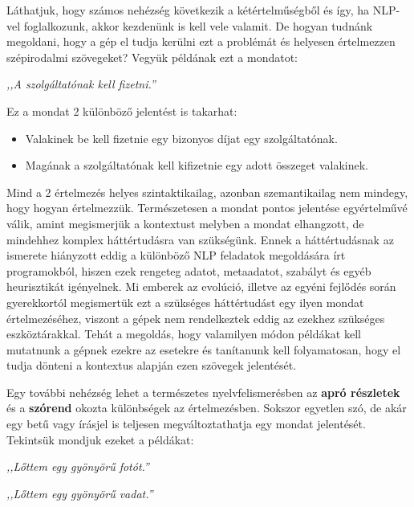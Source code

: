 Láthatjuk, hogy számos nehézség következik a kétértelműségből és így, ha NLP-vel foglalkozunk, akkor kezdenünk is kell vele valamit. De hogyan tudnánk megoldani, hogy a gép el tudja kerülni ezt a problémát és helyesen értelmezzen szépirodalmi szövegeket? 
Vegyük példának ezt a mondatot:

\vspace{0.5cm}
\centerline{\textit{,,A szolgáltatónak kell fizetni.''}}
\vspace{0.5cm}

\noindent Ez a mondat 2 különböző jelentést is takarhat:

\begin{itemize}
\item Valakinek be kell fizetnie egy bizonyos díjat egy szolgáltatónak.
\item Magának a szolgáltatónak kell kifizetnie egy adott összeget valakinek.
\end{itemize}

Mind a 2 értelmezés helyes szintaktikailag, azonban szemantikailag nem mindegy, hogy hogyan értelmezzük. Természetesen a mondat pontos jelentése egyértelművé válik, amint megismerjük a kontextust  melyben a mondat elhangzott, de mindehhez komplex háttértudásra van szükségünk. Ennek a háttértudásnak az ismerete hiányzott eddig a különböző NLP feladatok megoldására írt programokból, hiszen ezek rengeteg adatot, metaadatot, szabályt és egyéb heurisztikát igényelnek. Mi emberek az evolúció, illetve az egyéni fejlődés során gyerekkortól megismertük ezt a szükséges háttértudást egy ilyen mondat értelmezéséhez, viszont a gépek nem rendelkeztek eddig az ezekhez szükséges eszköztárakkal. Tehát a megoldás, hogy valamilyen módon példákat kell mutatnunk a gépnek ezekre az esetekre és tanítanunk kell folyamatosan, hogy el tudja dönteni a kontextus alapján ezen szövegek jelentését.

Egy további nehézség lehet a természetes nyelvfelismerésben az \textbf{apró részletek} és a \textbf{szórend} okozta különbségek az értelmezésben. Sokszor egyetlen szó, de akár egy betű vagy írásjel is teljesen megváltoztathatja egy mondat jelentését. Tekintsük mondjuk ezeket a példákat:

\vspace{0.5cm}
\centerline{\textit{,,Lőttem egy gyönyörű fotót.''}}
\centerline{\textit{,,Lőttem egy gyönyörű vadat.''}}
\vspace{0.5cm}

